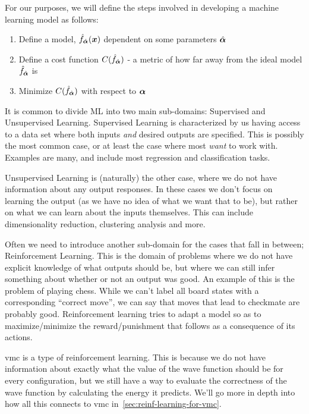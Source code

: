 \documentclass[Thesis.tex]{subfiles}
\begin{document}
For our purposes, we will define the steps involved in developing a machine
learning model as follows:

\begin{enumerate}
  \item Define a model, $\hat f_{\hat{\bm{\alpha}}}(\bm{x})$ dependent on some parameters $\hat{\bm{\alpha}}$
  \item Define a cost function $C(\hat f_{\hat{\bm{\alpha}}})$ - a metric of how far away from the
      ideal model $\hat f_{\hat{\bm{\alpha}}}$ is
  \item Minimize $C(\hat f_{\hat{\bm{\alpha}}})$ with respect to $\bm{\alpha}$
\end{enumerate}

It is common to divide ML into two main sub-domains: Supervised and Unsupervised
Learning. Supervised Learning is characterized by us having access to a data set
where both inputs \emph{and} desired outputs are specified. This is possibly the
most common case, or at least the case where most \emph{want} to work with.
Examples are many, and include most regression and classification tasks.

Unsupervised Learning is (naturally) the other case, where we do not have
information about any output responses. In these cases we don't focus on
learning the output (as we have no idea of what we want that to be), but rather
on what we can learn about the inputs themselves. This can include
dimensionality reduction, clustering analysis and more.

Often we need to introduce another sub-domain for the cases that fall in
between; Reinforcement Learning. This is the domain of problems where we do not
have explicit knowledge of what outputs should be, but where we can still infer
something about whether or not an output was good. An example of this is the
problem of playing chess. While we can't label all board states with a
corresponding ``correct move'', we can say that moves that lead to
checkmate are probably good. Reinforcement learning tries to adapt a model so as
to maximize/minimize the reward/punishment that follows as a consequence of its
actions.

\gls{vmc} is a type of reinforcement learning. This is because we
do not have information about exactly what the value of the wave function should
be for every configuration, but we still have a way to evaluate the correctness
of the wave function by calculating the energy it predicts. We'll go more in
depth into how all this connects to \gls{vmc} in~\cref{sec:reinf-learning-for-vmc}.
\end{document}
